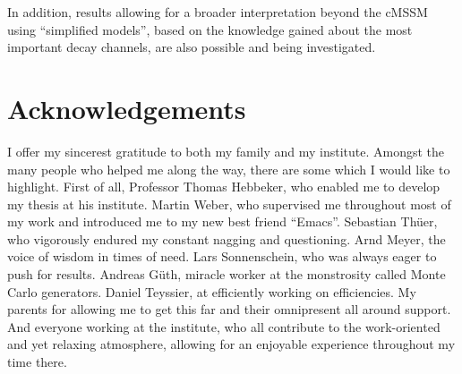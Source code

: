 In addition, results allowing for a broader interpretation beyond the cMSSM using ``simplified models'', based on the knowledge gained about the most important decay channels, are also possible and being investigated.

\section*{Acknowledgements} 
\label{sec:acknowledgements}

I offer my sincerest gratitude to both my family and my institute. Amongst the many people who helped me along the way, there are some which I would like to highlight. First of all, Professor Thomas Hebbeker, who enabled me to develop my thesis at his institute. Martin Weber, who supervised me throughout most of my work and introduced me to my new best friend ``Emacs''. Sebastian Th\"uer, who vigorously endured my constant nagging and questioning. Arnd Meyer, the voice of wisdom in times of need. Lars Sonnenschein, who was always eager to push for results. Andreas G\"uth, miracle worker at the monstrosity called Monte Carlo generators. Daniel Teyssier, at efficiently working on efficiencies. My parents for allowing me to get this far and their omnipresent all around support. And everyone working at the institute, who all contribute to the work-oriented and yet relaxing atmosphere, allowing for an enjoyable experience throughout my time there.

